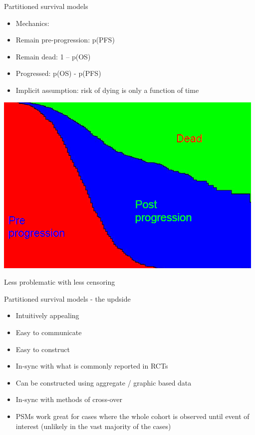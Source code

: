 \documentclass[ignorenonframetext,]{beamer}
\providecommand{\tightlist}{%
  \setlength{\itemsep}{0pt}\setlength{\parskip}{0pt}}
\begin{document}
\begin{frame}{Partitioned survival models}

\begin{itemize}
\item
  Mechanics:
\item
  Remain pre-progression: p(PFS)
\item
  Remain dead: 1 -- p(OS)
\item
  Progressed: p(OS) - p(PFS)
\item
  Implicit assumption: risk of dying is only a function of time
\end{itemize}

\end{frame}

\begin{frame}

\includegraphics[width=1\linewidth]{figures/psm}

Less problematic with less censoring

\end{frame}

\begin{frame}{Partitioned survival models - the updside}

\begin{itemize}
\tightlist
\item
  Intuitively appealing
\item
  Easy to communicate
\item
  Easy to construct
\item
  In-sync with what is commonly reported in RCTs
\item
  Can be constructed using aggregate / graphic based data
\item
  In-sync with methods of cross-over
\item
  PSMs work great for cases where the whole cohort is observed until
  event of interest (unlikely in the vast majority of the cases)
\end{itemize}

\end{frame}
\end{document}
